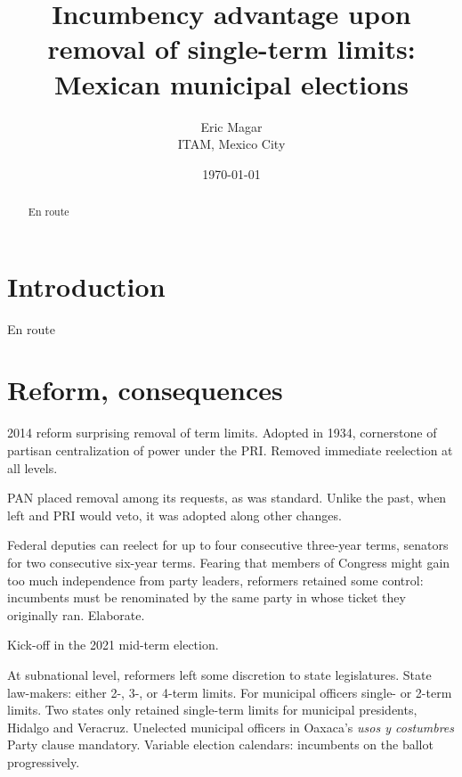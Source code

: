 \documentclass[letter,12pt]{article}
\begin{document}
\title{Incumbency advantage upon removal of single-term limits: Mexican municipal elections}
\author{Eric Magar \\ ITAM, Mexico City
}
\date{\today}
\maketitle


\begin{abstract}
\noindent En route
\end{abstract}



\section{Introduction}

\noindent En route

\section{Reform, consequences}

2014 reform surprising removal of term limits. Adopted in 1934, cornerstone of partisan centralization of power under the PRI. Removed immediate reelection at all levels.

PAN placed removal among its requests, as was standard. Unlike the past, when left and PRI would veto, it was adopted along other changes.

Federal deputies can reelect for up to four consecutive three-year terms, senators for two consecutive six-year terms. Fearing that members of Congress might gain too much independence from party leaders, reformers retained some control: incumbents must be renominated by the same party in whose ticket they originally ran. Elaborate. 

Kick-off in the 2021 mid-term election.

At subnational level, reformers left some discretion to state legislatures. State law-makers: either 2-, 3-, or 4-term limits. For municipal officers single- or 2-term limits. Two states only retained single-term limits for municipal presidents, Hidalgo and Veracruz. Unelected municipal officers in Oaxaca's \emph{usos y costumbres} Party clause mandatory. Variable election calendars: incumbents on the ballot progressively. 
\end{document}
